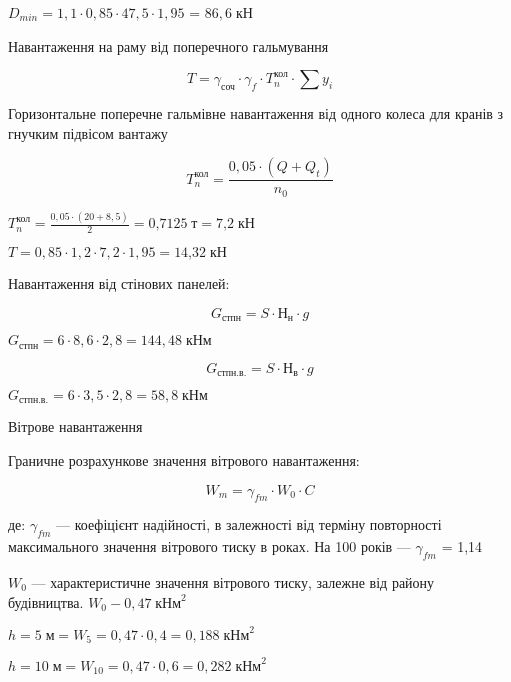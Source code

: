 \documentclass[a4paper,14pt]{article}
\begin{document}
$D_{min}=1,1\cdot 0,85 \cdot 47,5 \cdot 1,95$ = $86,6\;\textit{кН}$

Навантаження на раму від поперечного гальмування

\begin{equation}
    T=\gamma_\textit{соч}\cdot \gamma_f \cdot T^\textit{кол}_{n} \cdot \sum y_i
\end{equation}

Горизонтальне поперечне гальмівне навантаження від одного колеса 
   для кранів з гнучким підвісом вантажу 

\begin{equation}
    T^\textit{кол}_{n}=\frac {0,05\cdot (Q+Q_t)}{n_0}
\end{equation}

$T^\textit{кол}_{n}=\frac {0,05\cdot (20+8,5)}{2}=\textit{0,7125}\;\textit{т}=\textit{7,2}\;\textit{кН}$

$T=0,85\cdot 1,2 \cdot 7,2 \cdot 1,95 = \textit{14,32}\;\textit{кН}$

Навантаження від стінових панелей:

\begin{equation}
    G_\textit{стпн}= S \cdot Н_\textit{н}\cdot g
\end{equation}

$G_\textit{стпн}= 6 \cdot 8,6\cdot 2,8 = 144,48\;\textit{кНм}$

\begin{equation}
    G_\textit{стпн.в.}= S \cdot Н_\textit{в}\cdot g
\end{equation}

$G_\textit{стпн.в.}= 6 \cdot 3,5\cdot 2,8= 58,8\;\textit{кНм}$

Вітрове навантаження

Граничне розрахункове значення вітрового навантаження:

\begin{equation}
    W_\textit{m}= \gamma_{fm} \cdot W_\textit{0}\cdot C
\end{equation}

де:  $\gamma_{fm}$ ---  коефіцієнт надійності, в залежності від терміну повторності максимального значення вітрового тиску в роках. На 100 років --- $\gamma_{fm}$ = 1,14

$W_\textit{0}$ --- характеристичне значення вітрового тиску, залежне від району будівництва. $W_\textit{0} - 0,47\;\textit{кНм}^2$

$h=5\;\textit{м} = W_{5}= 0,47\cdot 0,4 = 0,188\;\textit{кНм}^2$

$h=10\;\textit{м} = W_{10}= 0,47\cdot 0,6 = 0,282\;\textit{кНм}^2$
\end{document}
